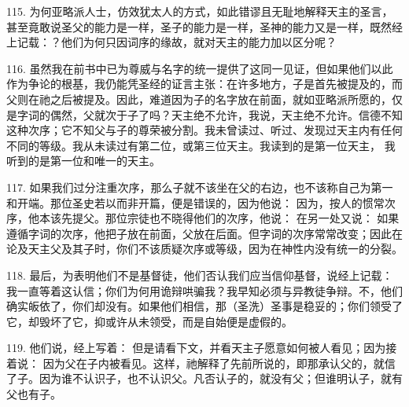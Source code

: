 \par

115. 为何亚略派人士，仿效犹太人的方式，如此错谬且无耻地解释天主的圣言，甚至竟敢说圣父的能力是一样，圣子的能力是一样，圣神的能力又是一样，既然经上记载：？他们为何只因词序的缘故，就对天主的能力加以区分呢？\par

116. 虽然我在前书中已为尊威与名字的统一提供了这同一见证，但如果他们以此作为争论的根基，我仍能凭圣经的证言主张：在许多地方，子是首先被提及的，而父则在祂之后被提及。因此，难道因为子的名字放在前面，就如亚略派所愿的，仅是字词的偶然，父就次于子了吗？天主绝不允许，我说，天主绝不允许。信德不知这种次序；它不知父与子的尊荣被分割。我未曾读过、听过、发现过天主内有任何不同的等级。我从未读过有第二位，或第三位天主。我读到的是第一位天主， 我听到的是第一位和唯一的天主。\par

117. 如果我们过分注重次序，那么子就不该坐在父的右边，也不该称自己为第一和开端。那位圣史若以而非开篇，便是错误的，因为他说：  因为，按人的惯常次序，他本该先提父。那位宗徒也不晓得他们的次序，他说：  在另一处又说：  如果遵循字词的次序，他把子放在前面，父放在后面。但字词的次序常常改变；因此在论及天主父及其子时，你们不该质疑次序或等级，因为在神性内没有统一的分裂。\par

\par

118. 最后，为表明他们不是基督徒，他们否认我们应当信仰基督，说经上记载：  我一直等着这认信；你们为何用诡辩哄骗我？我早知必须与异教徒争辩。不，他们确实皈依了，你们却没有。如果他们相信，那（圣洗）圣事是稳妥的；你们领受了它，却毁坏了它，抑或许从未领受，而是自始便是虚假的。\par

119. 他们说，经上写着： 但是请看下文，并看天主子愿意如何被人看见；因为接着说：  因为父在子内被看见。这样，祂解释了先前所说的，即那承认父的，就信了子。因为谁不认识子，也不认识父。凡否认子的，就没有父；但谁明认子，就有父也有子。\par

